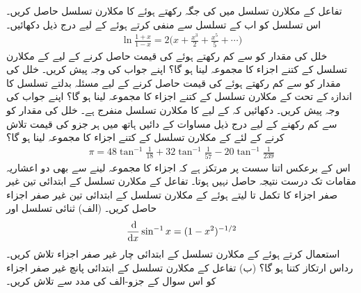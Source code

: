 تفاعل  کے مکلارن تسلسل میں  کی جگہ   رکھتے  ہوئے  کا مکلارن تسلسل حاصل کریں۔ اس تسلسل کو اب  کے تسلسل سے منفی کرتے ہوئے  کے لیے درج ذیل دکھائیں۔
\begin{align*}
\ln\frac{1+x}{1-x}=2\big(x+\frac{x^3}{2}+\frac{x^5}{5}+\cdots\big)
\end{align*}
خلل کی مقدار کو  سے  کم رکھتے ہوئے  کی قیمت حاصل کرنے کے لیے  کے مکلارن تسلسل کے کتنے اجزاء کا مجموعہ لینا ہو گا؟ اپنے جواب کی وجہ پیش کریں۔
خلل کی مقدار کو  سے  کم رکھتے ہوئے  کی قیمت حاصل کرنے کے لیے مسئلہ بدلتے تسلسل کا اندازہ کے تحت    کے مکلارن تسلسل کے کتنے اجزاء کا مجموعہ لینا ہو گا؟ اپنے جواب کی وجہ پیش کریں۔
دکھائیں کہ  کے لیے  کا مکلارن تسلسل منفرج ہے۔
خلل کی مقدار کو  سے کم  رکھنے کے لیے درج ذیل مساوات کے دائیں ہاتھ میں ہر  جزو کی قیمت تلاش کرنے کے لئے  کے مکلارن تسلسل کے کتنے اجزاء کا مجموعہ لینا ہو گا؟ 
\begin{align*}
\pi=48\tan^{-1}\frac{1}{18}+32\tan^{-1}\frac{1}{57}-20\tan^{-1}\frac{1}{239}
\end{align*}
اس کے برعکس  اتنا سست  پر مرتکز ہے کہ  اجزاء کا مجموعہ لینے سے بھی دو اعشاریہ مقامات تک درست نتیجہ حاصل نہیں ہوتا۔
تفاعل  کے مکلارن تسلسل کے ابتدائی تین غیر صفر اجزاء کا تکمل  تا  لیتے ہوئے  کے مکلارن  تسلسل کے ابتدائی تین غیر صفر اجزاء حاصل کریں۔ 
(الف) ثنائی تسلسل اور
\begin{align*}
\frac{\dif}{\dif x}\sin^{-1}x=(1-x^2)^{-1/2}
\end{align*}
استعمال کرتے ہوئے   کے مکلارن تسلسل کے ابتدائی چار غیر صفر اجزاء تلاش کریں۔رداس ارتکاز کتنا ہو گا؟ (ب) تفاعل  کے مکلارن تسلسل کے ابتدائی پانچ غیر صفر اجزاء کو اس سوال کے جزو-الف کی مدد سے تلاش کریں۔

